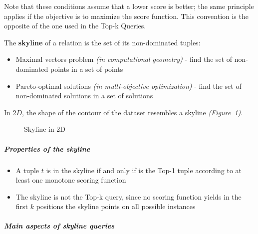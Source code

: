 \documentclass[english]{article}
\begin{document}
Note that these conditions assume that a lower score is better;
the same principle applies if the objective is to maximize the score function.
This convention is the opposite of the one used in the Top-k Queries.

The \textbf{skyline} of a relation is the set of its non-dominated tuples:

\begin{itemize}
  \item Maximal vectors problem \textit{(in computational geometry)} - find the set of non-dominated points in a set of points
  \item Pareto-optimal solutions \textit{(in multi-objective optimization)} - find the set of non-dominated solutions in a set of solutions
\end{itemize}

In \(2D\), the shape of the contour of the dataset resembles a skyline \textit{(Figure~\ref{fig:skyline-2d})}.

\begin{figure}[htbp]
  \centering
  \bigskip
  \caption{Skyline in 2D}
  \label{fig:skyline-2d}
  \bigskip
\end{figure}

\subparagraph*{Properties of the skyline}

\begin{itemize}
  \item A tuple \(t\) is in the skyline if and only if is the Top-1 tuple according to at least one monotone scoring function
  \item The skyline is not the Top-k query, since no scoring function yields in the first \(k\) positions the skyline points on all possible instances
\end{itemize}

\subparagraph*{Main aspects of skyline queries}
\end{document}
